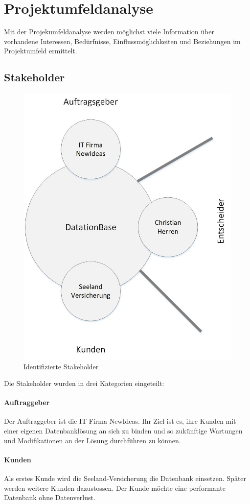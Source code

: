 \documentclass{article}
\begin{document}
\section{Projektumfeldanalyse}
Mit der Projekumfeldanalyse werden möglichst viele Information über vorhandene Interessen, Bedürfnisse, Einflussmöglichkeiten und Beziehungen im Projektumfeld ermittelt.
\subsection{Stakeholder}
\begin{figure}[H]
	\centering
  	\includegraphics[width=0.7\linewidth]{images/stakeholder.jpg}
  	\caption{Identifizierte Stakeholder}
 	\label{fig:stakeholder}
\end{figure}
Die Stakeholder wurden in drei Kategorien eingeteilt:
\paragraph{Auftraggeber}
Der Auftraggeber ist die IT Firma NewIdeas. Ihr Ziel ist es, ihre Kunden mit einer eigenen Datenbanklösung an sich zu binden und so zukünftige Wartungen und Modifikationen an der Lösung durchführen zu können.
\paragraph{Kunden}
Als erstes Kunde wird die Seeland-Versicherung die Datenbank einsetzen. Später werden weitere Kunden dazustossen. Der Kunde möchte eine performante Datenbank ohne Datenverlust.
\end{document}

